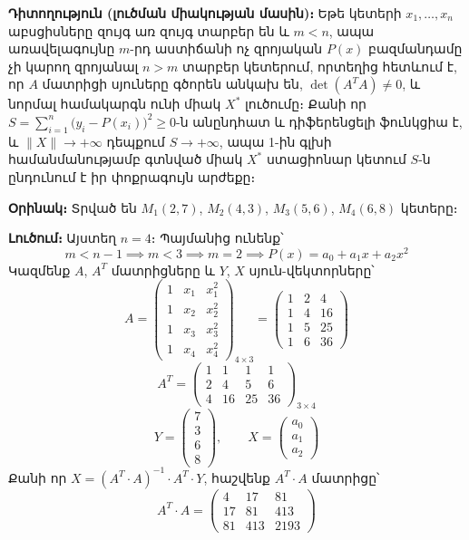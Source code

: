 \documentclass[12pt,a4paper]{article}
\numberwithin{equation}{section}
\numberwithin{figure}{section}
\begin{document}
\par\medskip\noindent\textbf{Դիտողություն (լուծման միակության մասին)։} Եթե կետերի $x_1, \dots, x_n$ աբսցիսները զույգ առ զույգ տարբեր են և $m < n$, ապա առավելագույնը $m$-րդ աստիճանի ոչ զրոյական $P(x)$ բազմանդամը չի կարող զրոյանալ $n > m$ տարբեր կետերում, որտեղից հետևում է, որ $A$ մատրիցի սյուները գծորեն անկախ են, $\det(A^T A) \neq 0$, և նորմալ համակարգն ունի միակ $X^*$ լուծումը։ Քանի որ $S = \sum_{i=1}^n \bigl(y_i - P(x_i)\bigr)^2 \geqslant 0$-ն անընդհատ և դիֆերենցելի ֆունկցիա է, և $\|X\| \to +\infty$ դեպքում $S \to +\infty$, ապա 1-ին գլխի համանմանությամբ գտնված միակ $X^*$ ստացիոնար կետում $S$-ն ընդունում է իր փոքրագույն արժեքը։
\par\medskip\noindent\textbf{Օրինակ։} Տրված են $M_1(2, 7)$, $M_2(4, 3)$, $M_3(5, 6)$, $M_4(6, 8)$ կետերը։

\par\medskip\noindent\textbf{Լուծում։} Այստեղ $n = 4$։ Պայմանից ունենք՝
\[
m < n - 1 \implies m < 3 \implies m = 2 \implies P(x) = a_0 + a_1 x + a_2 x^2
\]
Կազմենք $A$, $A^T$ մատրիցները և $Y$, $X$ սյուն-վեկտորները՝
\[
A =
\begin{pmatrix}
1 & x_1 & x_1^2 \\
1 & x_2 & x_2^2 \\
1 & x_3 & x_3^2 \\
1 & x_4 & x_4^2
\end{pmatrix}_{4 \times 3}
=
\begin{pmatrix}
1 & 2 & 4 \\
1 & 4 & 16 \\
1 & 5 & 25 \\
1 & 6 & 36
\end{pmatrix}
\]
\[
A^T =
\begin{pmatrix}
1 & 1 & 1 & 1 \\
2 & 4 & 5 & 6 \\
4 & 16 & 25 & 36
\end{pmatrix}_{3 \times 4}
\]
\[
Y =
\begin{pmatrix}
7 \\
3 \\
6 \\
8
\end{pmatrix},
\qquad
X =
\begin{pmatrix}
a_0 \\
a_1 \\
a_2
\end{pmatrix}
\]
Քանի որ $X = (A^T \cdot A)^{-1} \cdot A^T \cdot Y$, հաշվենք $A^T \cdot A$ մատրիցը՝
\[
A^T \cdot A =
\begin{pmatrix}
4 & 17 & 81 \\
17 & 81 & 413 \\
81 & 413 & 2193
\end{pmatrix}
\]
\end{document}
